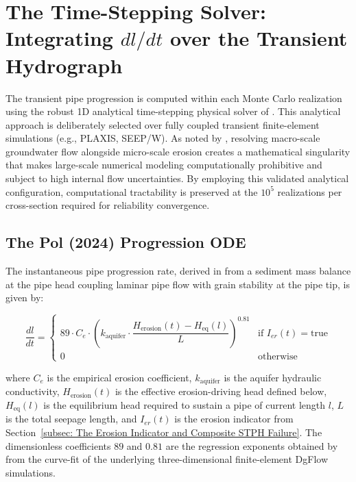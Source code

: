 \section{The Time-Stepping Solver: Integrating \texorpdfstring{$dl/dt$}{dl/dt} over the Transient Hydrograph}
\label{sec: The Time-Stepping Solver: Integrating dl/dt over the Transient Hydrograph}

The transient pipe progression is computed within each Monte Carlo realization using the robust 1D analytical time-stepping physical solver of \textcite{pol_compgeo_2024}. This analytical approach is deliberately selected over fully coupled transient finite-element simulations (e.g., PLAXIS, SEEP/W). As noted by \textcite{vanderLinde2025}, resolving macro-scale groundwater flow alongside micro-scale erosion creates a mathematical singularity that makes large-scale numerical modeling computationally prohibitive and subject to high internal flow uncertainties. By employing this validated analytical configuration, computational tractability is preserved at the $10^5$ realizations per cross-section required for reliability convergence.

\subsection{The Pol (2024) Progression ODE}
\label{subsec: The Pol Progression ODE}

The instantaneous pipe progression rate, derived in \textcite{pol_compgeo_2024} from a sediment mass balance at the pipe head coupling laminar pipe flow with grain stability at the pipe tip, is given by:

$$\frac{dl}{dt} = \begin{cases} 89 \cdot C_e \cdot \left(k_\mathrm{aquifer} \cdot \dfrac{H_\mathrm{erosion}(t) - H_\mathrm{eq}(l)}{L}\right)^{0.81} & \text{if } I_{er}(t) = \text{true}\\[6pt] 0 & \text{otherwise} \end{cases}$$

where $C_e$ is the empirical erosion coefficient, $k_\mathrm{aquifer}$ is the aquifer hydraulic conductivity, $H_\mathrm{erosion}(t)$ is the effective erosion-driving head defined below, $H_\mathrm{eq}(l)$ is the equilibrium head required to sustain a pipe of current length $l$, $L$ is the total seepage length, and $I_{er}(t)$ is the erosion indicator from Section~\ref{subsec: The Erosion Indicator and Composite STPH Failure}. The dimensionless coefficients $89$ and $0.81$ are the regression exponents obtained by \textcite{pol_compgeo_2024} from the curve-fit of the underlying three-dimensional finite-element DgFlow simulations.

